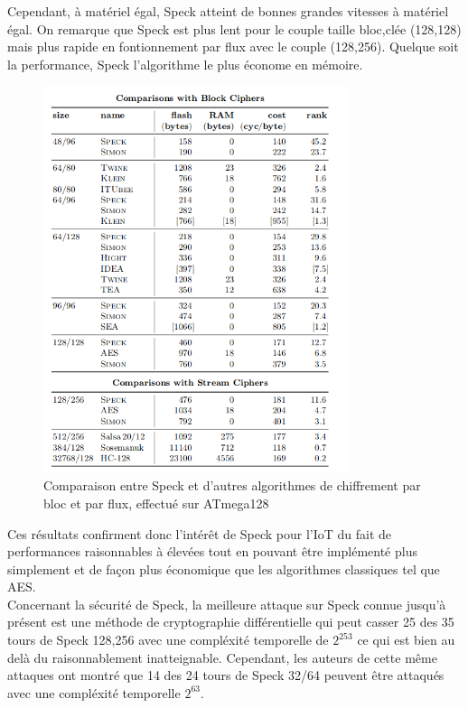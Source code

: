 			Cependant, à matériel égal, Speck atteint de bonnes grandes vitesses à matériel
			égal. On remarque que Speck est plus lent pour le couple taille bloc,clée
			(128,128) mais plus rapide en fontionnement par flux avec le couple (128,256).
			Quelque soit la performance, Speck l'algorithme le plus économe en mémoire.


			\begin{figure}[H]
				\centering
				\includegraphics[width=0.8\textwidth]{imgs/perfSpeck.png}
				\caption{Comparaison entre Speck et d'autres algorithmes de chiffrement par bloc et par flux, effectué sur ATmega128 \cite{speck_micro}}
				\label{perfSpeck}
			\end{figure}

			Ces résultats confirment donc l'intérêt de Speck pour l'IoT du fait de performances
			raisonnables à élevées tout en pouvant être implémenté plus simplement et de façon
			plus économique que	les algorithmes classiques tel que AES.  \\

			Concernant la sécurité de Speck, la meilleure attaque sur Speck connue
			jusqu'à présent est une méthode de cryptographie différentielle qui peut
			casser 25 des 35 tours de Speck 128,256 avec une compléxité temporelle de
			$2^253$ \cite{speck_attack} ce qui est bien au delà du raisonnablement inatteignable.
			Cependant, les auteurs de cette même attaques ont montré que 14 des 24
			tours de Speck 32/64 peuvent être attaqués avec une compléxité temporelle $2^63$. \\


